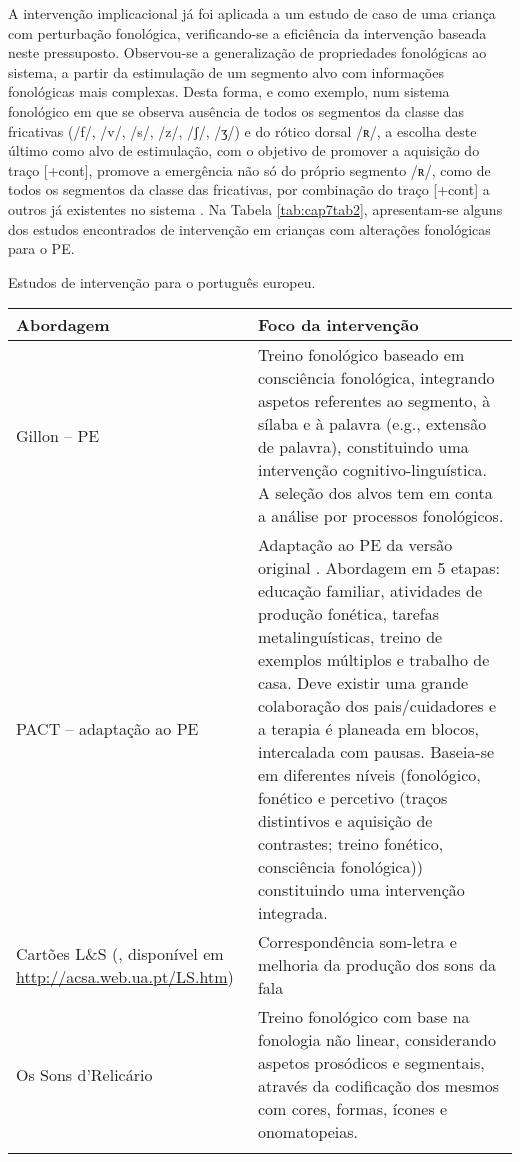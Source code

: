 \documentclass[output=paper,colorlinks,citecolor=brown,booklanguage=portuguese]{langscibook}
\begin{document}
A intervenção implicacional já foi aplicada a um estudo de caso de uma criança com perturbação fonológica, verificando-se a eficiência da intervenção baseada neste pressuposto. Observou-se a generalização de propriedades fonológicas ao sistema, a partir da estimulação de um segmento alvo com informações fonológicas mais complexas. Desta forma, e como exemplo, num sistema fonológico em que se observa ausência de todos os segmentos da classe das fricativas (/f/, /v/, /s/, /z/, /ʃ/, /ʒ/)  e do rótico dorsal /ʀ/, a escolha deste último como alvo de estimulação, com o objetivo de promover a aquisição do traço [+cont], promove a emergência não só do próprio segmento /ʀ/, como de todos os segmentos da classe das fricativas, por combinação do traço [+cont] a outros já existentes no sistema \citep{Mota2001, Reis2018, Alves2018, Reis2020}. Na Tabela \ref{tab:cap7tab2}, apresentam-se alguns dos estudos encontrados de intervenção em crianças com alterações fonológicas para o PE.



\begin{Tabela}
\caption{Estudos de intervenção para o português europeu.}
\label{tab:cap7tab2}


\begin{tabularx}{\textwidth}{p{4cm}Q}
\lsptoprule
\textbf{Abordagem} & \textbf{Foco da intervenção} \\
\midrule
Gillon -- PE \citep{Gillon2007, Lousada2012}  &  Treino fonológico baseado em consciência fonoló\-gica, integrando aspetos referentes ao segmento, à sílaba e à palavra (e.g., extensão de palavra), cons\-tituindo uma intervenção cognitivo-linguística. A seleção dos alvos tem em conta a análise por processos fonológicos.\\
\tablevspace
PACT -- adaptação ao PE \citep{Pedro2014} & Adaptação ao PE da versão original \citep{Bowen1999}. Abordagem em 5 etapas: educação familiar, atividades de produção fonética, tarefas metalinguísticas, treino de exemplos múltiplos e trabalho de casa. Deve existir uma grande colaboração dos pais/cuidadores e a terapia é planeada em blocos, intercalada com pausas. Baseia-se em diferentes níveis (fonológico, fonético e percetivo (traços distintivos e aquisição de contrastes; treino fonético, consciência fonológica)) constituindo uma intervenção integrada. \\
\tablevspace
Cartões L\&S (\citealt{Pedro2014}, disponível em \url{http://acsa.web.ua.pt/LS.htm}) & Correspondência som-letra e melhoria da produção dos sons da fala \\
\tablevspace
Os Sons d’Relicário \citep{Alves2014, Alves2018, Alves2014a} & Treino fonológico com base na fonologia não li\-near, considerando aspetos prosódicos e segmentais, através da codificação dos mesmos com cores, formas, ícones e onomatopeias.\\
\lspbottomrule
\end{tabularx}
\end{Tabela}
\end{document}
